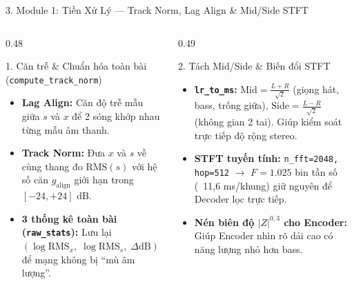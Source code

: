 \documentclass[aspectratio=169,10pt]{beamer}
\begin{document}
\begin{frame}{3. Module 1: Tiền Xử Lý — Track Norm, Lag Align \& Mid/Side STFT}
  \footnotesize
  \begin{columns}[T]
    \begin{column}{0.48\textwidth}
      \begin{block}{1. Căn trễ \& Chuẩn hóa toàn bài (\texttt{compute\_track\_norm})}
        \begin{itemize}
          \item \textbf{Lag Align:} Căn độ trễ mẫu giữa $s$ và $x$ để 2 sóng khớp nhau từng mẫu âm thanh.
          \item \textbf{Track Norm:} Đưa $x$ và $s$ về cùng thang đo $\text{RMS}(s)$ với hệ số căn $g_{\text{align}}$ giới hạn trong $[-24, +24]\text{ dB}$.
          \item \textbf{3 thống kê toàn bài (\texttt{raw\_stats}):} Lưu lại $(\log \text{RMS}_x,\; \log \text{RMS}_s,\; \Delta\text{dB})$ để mạng không bị ``mù âm lượng''.
        \end{itemize}
      \end{block}
    \end{column}
    \begin{column}{0.49\textwidth}
      \begin{exampleblock}{2. Tách Mid/Side \& Biến đổi STFT}
        \begin{itemize}
          \item \textbf{\texttt{lr\_to\_ms}:} $\text{Mid} = \frac{L+R}{\sqrt{2}}$ (giọng hát, bass, trống giữa), $\text{Side} = \frac{L-R}{\sqrt{2}}$ (không gian 2 tai). Giúp kiểm soát trực tiếp độ rộng stereo.
          \item \textbf{STFT tuyến tính:} \texttt{n\_fft=2048, hop=512} $\rightarrow$ $F=1.025$ bin tần số (~11,6 ms/khung) giữ nguyên để Decoder lọc trực tiếp.
          \item \textbf{Nén biên độ $|Z|^{0{,}3}$ cho Encoder:} Giúp Encoder nhìn rõ dải cao có năng lượng nhỏ hơn bass.
        \end{itemize}
      \end{exampleblock}
    \end{column}
  \end{columns}
\end{frame}
\end{document}
